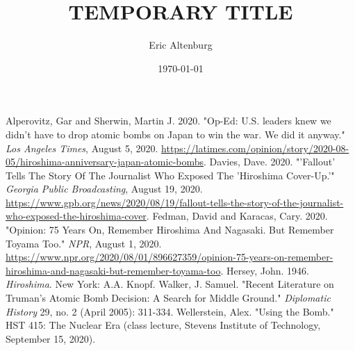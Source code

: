 \documentclass[12pt]{turabian-researchpaper}
\title{TEMPORARY TITLE}
\author{Eric Altenburg}
\date{\today}
\begin{document}
\maketitle



\newpage

\begin{thebibliography}{6}
	 Alperovitz, Gar and Sherwin, Martin J. 2020. "Op-Ed: U.S. leaders knew we didn’t have to drop atomic bombs on Japan to win the war. We did it anyway." \textit{Los Angeles Times}, August 5, 2020. 
	\url{https://latimes.com/opinion/story/2020-08-05/hiroshima-anniversary-japan-atomic-bombs}.
	 Davies, Dave. 2020. "'Fallout' Tells The Story Of The Journalist Who Exposed The 'Hiroshima Cover-Up.'" \textit{Georgia Public Broadcasting}, August 19, 2020. \url{https://www.gpb.org/news/2020/08/19/fallout-tells-the-story-of-the-journalist-who-exposed-the-hiroshima-cover}.
	 Fedman, David and Karacas, Cary. 2020. "Opinion: 75 Years On, Remember Hiroshima And Nagasaki. But Remember Toyama Too." \textit{NPR}, August 1, 2020. \url{https://www.npr.org/2020/08/01/896627359/opinion-75-years-on-remember-hiroshima-and-nagasaki-but-remember-toyama-too}.
	 Hersey, John. 1946. \textit{Hiroshima}. New York: A.A. Knopf.
	 Walker, J. Samuel. "Recent Literature on Truman's Atomic Bomb Decision: A Search for Middle Ground." \textit{Diplomatic History} 29, no. 2 (April 2005): 311-334.
	 Wellerstein, Alex. "Using the Bomb." HST 415: The Nuclear Era (class lecture, Stevens Institute of Technology, September 15, 2020).
\end{thebibliography}
\end{document}
